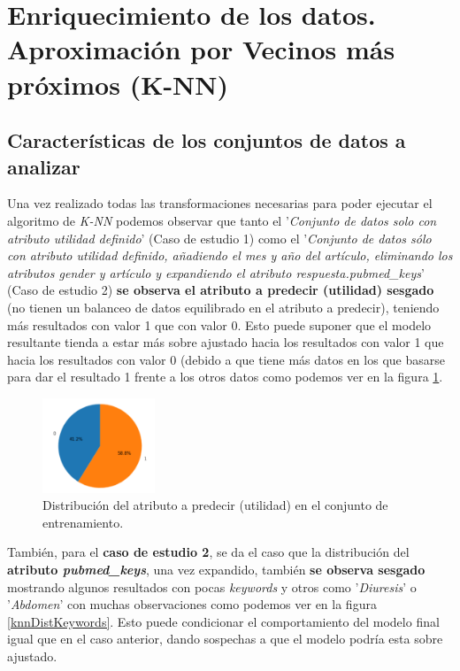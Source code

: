 \section{Enriquecimiento de los datos. Aproximación por Vecinos más próximos (K-NN)}
\label{resultados:knn}

\subsection{Características de los conjuntos de datos a analizar}
\label{resultados:knn_caracteristicas}
Una vez realizado todas las transformaciones necesarias para poder ejecutar el algoritmo de \textit{K-NN} podemos observar que tanto el '\textit{Conjunto de datos solo con atributo utilidad definido}' (Caso de estudio 1) como el '\textit{Conjunto de datos sólo con atributo utilidad definido, añadiendo el mes y año del artículo, eliminando los atributos gender y artículo y expandiendo el atributo respuesta.pubmed\_keys}' (Caso de estudio 2) \textbf{se observa el atributo a predecir (utilidad) sesgado} (no tienen un balanceo de datos equilibrado en el atributo a predecir), teniendo más resultados con valor 1 que con valor 0. Esto puede suponer que el modelo resultante tienda a estar más sobre ajustado hacia los resultados con valor 1 que hacia los resultados con valor 0 (debido a que tiene más datos en los que basarse para dar el resultado 1 frente a los otros datos como podemos ver en la figura \ref{knnDistUtilidad}.

\begin{figure}[!htb]
  \centering
    \includegraphics[width=0.3\textwidth]{images/resultados_knn_conjunto1.png}
    \caption{Distribución del atributo a predecir (utilidad) en el conjunto de entrenamiento.}
  \label{knnDistUtilidad}
\end{figure}

También, para el \textbf{caso de estudio 2}, se da el caso que la distribución del \textbf{atributo \textit{pubmed\_keys}}, una vez expandido, también \textbf{se observa sesgado} mostrando algunos resultados con pocas \textit{keywords} y otros como '\textit{Diuresis}' o '\textit{Abdomen}' con muchas observaciones como podemos ver en la figura \ref{knnDistKeywords}. Esto puede condicionar el comportamiento del modelo final igual que en el caso anterior, dando sospechas a que el modelo podría esta sobre ajustado\cite{ref:knn_overfiting}.

